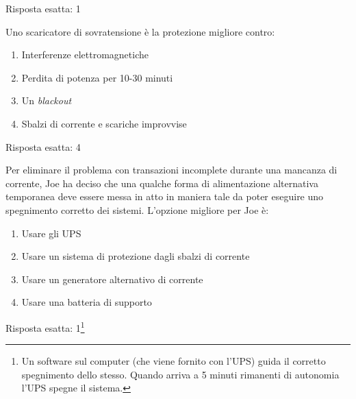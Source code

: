 \begin{Answer} [
  ref={esSFDP2},
  number={2}
  ]

  \Question Risposta esatta: 1

\end{Answer}


\begin{Exercise} [
  title={Quiz},
  label={esSFDP3}
  ]

  \Question Uno scaricatore di sovratensione è la protezione migliore contro:
  \begin{enumerate}
   \item Interferenze elettromagnetiche
   \item Perdita di potenza per 10-30 minuti
   \item Un \textit{blackout}
   \item Sbalzi di corrente e scariche improvvise
  \end{enumerate}
  
\end{Exercise}


\begin{Answer} [
  ref={esSFDP3},
  number={3}
  ]

  \Question Risposta esatta: 4

\end{Answer}


\begin{Exercise} [
  title={Quiz},
  label={esSFDP4}
  ]

  \Question Per eliminare il problema con transazioni incomplete durante una 
mancanza di corrente, Joe ha deciso che una qualche forma di alimentazione 
alternativa temporanea deve essere messa in atto in maniera tale da poter 
eseguire uno spegnimento corretto dei sistemi. L'opzione migliore per Joe è:
\begin{enumerate}
 \item Usare gli UPS
 \item Usare un sistema di protezione dagli sbalzi di corrente
 \item Usare un generatore alternativo di corrente
 \item Usare una batteria di supporto
\end{enumerate}
  
\end{Exercise}


\begin{Answer} [
  ref={esSFDP4},
  number={4}
  ]

  \Question Risposta esatta: 1\footnote{Un software sul computer (che viene 
fornito con l'UPS) guida il corretto spegnimento dello stesso. Quando arriva a 
5 minuti rimanenti di autonomia l'UPS spegne il sistema.}

\end{Answer}
